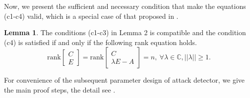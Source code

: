\documentclass[english]{cccconf}
\theoremstyle{definition}
\newtheorem{lemma}{Lemma}
\begin{document}
Now, we present the sufficient and necessary condition that make the equations (c1-c4) valid, which is a special case of that proposed in      \citep{5573041}.
\begin{lemma} The conditions (c1-c3) in Lemma 2 is compatible and the condition (c4) is satisfied if and only if the following rank equation holds.
\begin{equation}
\textrm{rank}\begin{bmatrix}
C\\E
\end{bmatrix}=\textrm{rank}\begin{bmatrix}
C\\\lambda E-A
\end{bmatrix}=n,\ \forall\lambda\in\mathbb{C},||\lambda||\geq 1.
\end{equation}
\end{lemma}
For convenience of the subsequent parameter design of attack detector, we give the main proof steps, the detail see \citep{5573041}.
\end{document}
